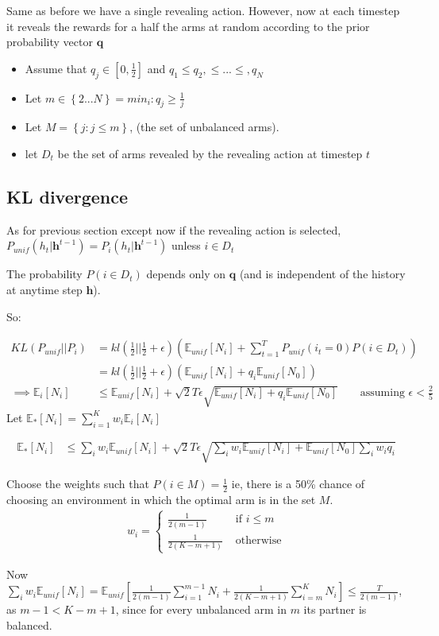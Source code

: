 \documentclass{article}
\newcommand{\E}{\mathbb E}
\newcommand{\set}[1]{\left\{#1\right\}}
\newcommand{\eqn}[1]{\begin{align}#1\end{align}}
\renewcommand{\Pi}[1]{P_i\left( #1 \right)}
\newcommand{\Pu}[1]{P_{unif}\left( #1 \right)}
\newcommand{\Ei}[1]{\E_i\left[ #1 \right]}
\newcommand{\Eu}[1]{\E_{unif}\left[ #1 \right]}
\newcommand{\Es}[1]{\E_{*}\left[ #1 \right]}
\newcommand{\kl}[2]{KL\left(#1 || #2 \right)}
\theoremstyle{plain}
\theoremstyle{definition}
\begin{document}
Same as before we have a single revealing action. However, now at each timestep it reveals the rewards for a half the arms at random according to the prior probability vector $\boldsymbol{q}$


\begin{itemize}
\item Assume that $q_j \in [0,\frac{1}{2}]$ and $q_1 \leq q_2, \leq ...\leq,q_N$ 
\item Let $m \in \set{2...N} = min_i : q_j \geq \frac{1}{j}$
\item Let $M = \set{j:j \leq m}$, (the set of unbalanced arms).
\item let $D_t$ be the set of arms revealed by the revealing action at timestep $t$
\end{itemize}


\subsection{KL divergence}
As for previous section except now if the revealing action is selected, $\Pu{h_t|\boldsymbol h^{t-1}} = \Pi{h_t|\boldsymbol h^{t-1}}$ unless $i \in D_t$

The probability $P(i \in D_t)$ depends only on $\boldsymbol{q}$ (and is independent of the history at anytime step $\boldsymbol{h}$). 

So:

\eqn {
\kl{P_{unif}}{P_i} & = kl(\frac{1}{2}||\frac{1}{2}+\epsilon)\left(\Eu{N_i}+\sum_{t=1}^T\Pu{i_t=0}P(i \in D_t)\right)\\
& = kl(\frac{1}{2}||\frac{1}{2}+\epsilon)\left(\Eu{N_i}+q_i\Eu{N_0}\right)\\
\implies \Ei{N_i} & \leq \Eu{N_i} + \sqrt{2}T\epsilon \sqrt{\Eu{N_i}+q_i\Eu{N_0}} \qquad \text{assuming }  \epsilon < \frac{2}{5}
}
Let $\Es{N_i} = \sum_{i=1}^K w_i\Ei{N_i}$


\eqn {
\Es{N_i} & \leq \sum_i w_i\Eu{N_i} + \sqrt{2}T\epsilon \sqrt{\sum_i w_i\Eu{N_i}+\Eu{N_0}\sum_i w_i q_i} 
}

Choose the weights such that $P(i \in M) = \frac{1}{2}$ ie, there is a 50\% chance of choosing an environment in which the optimal arm is in the set $M$.
\eqn {
w_i = \begin{cases}
\frac{1}{2(m-1)} & \text{ if } i \leq m \\
\frac{1}{2(K-m+1)} & \text{ otherwise}
\end{cases}
}

Now $\sum_i w_i\Eu{N_i} = \Eu{\frac{1}{2(m-1)}\sum_{i=1}^{m-1}N_i+\frac{1}{2(K-m+1)}\sum_{i=m}^{K}N_i} \leq \frac{T}{2(m-1)}$, as  $m-1 < K-m+1$, since for every unbalanced arm in $m$ its partner is balanced.
\end{document}
